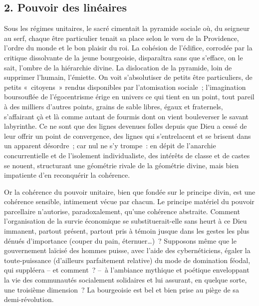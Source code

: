 \documentclass[french,twoside]{book} %
\newcommand{\astermono}{\medskip\centerline{\color{rubric}\large\selectfont{\syms ✻}}\medskip\par}%
\begin{document}
\subsection[{2. Pouvoir des linéaires}]{\textsc{2.} Pouvoir des linéaires}
\noindent Sous les régimes unitaires, le sacré cimentait la pyramide sociale où, du seigneur au serf, chaque être particulier tenait sa place selon le vœu de la Providence, l’ordre du monde et le bon plaisir du roi. La cohésion de l’édifice, corrodée par la critique dissolvante de la jeune bourgeoisie, disparaîtra sans que s’efface, on le sait, l’ombre de la hiérarchie divine. La dislocation de la pyramide, loin de supprimer l’humain, l’émiette. On voit s’absolutiser de petits être particuliers, de petits « citoyens » rendus disponibles par l’atomisation sociale ; l’imagination boursouflée de l’égocentrisme érige en univers ce qui tient en un point, tout pareil à des milliers d’autres points, grains de sable libres, égaux et fraternels, s’affairant çà et là comme autant de fourmis dont on vient bouleverser le savant labyrinthe. Ce ne sont que des lignes devenues folles depuis que Dieu a cessé de leur offrir un point de convergence, des lignes qui s’entrelacent et se brisent dans un apparent désordre ; car nul ne s’y trompe : en dépit de l’anarchie concurrentielle et de l’isolement individualiste, des intérêts de classe et de castes se nouent, structurant une géométrie rivale de la géométrie divine, mais bien impatiente d’en reconquérir la cohérence.\par
Or la cohérence du pouvoir unitaire, bien que fondée sur le principe divin, est une cohérence sensible, intimement vécue par chacun. Le principe matériel du pouvoir parcellaire n’autorise, paradoxalement, qu’une cohérence abstraite. Comment l’organisation de la survie économique se substituerait-elle sans heurt à ce Dieu immanent, partout présent, partout pris à témoin jusque dans les gestes les plus dénués d’importance (couper du pain, éternuer…) ? Supposons même que le gouvernement laïcisé des hommes puisse, avec l’aide des cybernéticiens, égaler la toute-puissance (d’ailleurs parfaitement relative) du mode de domination féodal, qui suppléera – et comment ? – à l’ambiance mythique et poétique enveloppant la vie des communautés socialement solidaires et lui assurant, en quelque sorte, une troisième dimension ? La bourgeoisie est bel et bien prise au piège de sa demi-révolution.\par

\astermono
\end{document}
